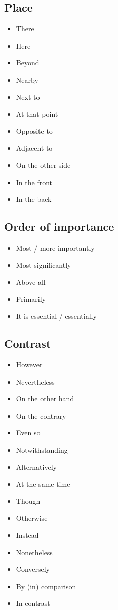 \subsection{Place}
\begin{itemize}
    \item There
    \item Here
    \item Beyond
    \item Nearby
    \item Next to
    \item At that point
    \item Opposite to
    \item Adjacent to
    \item On the other side
    \item In the front
    \item In the back
\end{itemize}

\subsection{Order of importance}
\begin{itemize}
    \item Most / more importantly
    \item Most significantly
    \item Above all
    \item Primarily
    \item It is essential / essentially
\end{itemize}


\subsection{Contrast}
\begin{itemize}
    \item However
    \item Nevertheless
    \item On the other hand
    \item On the contrary
    \item Even so
    \item Notwithstanding
    \item Alternatively
    \item At the same time
    \item Though
    \item Otherwise
    \item Instead
    \item Nonetheless
    \item Conversely
    \item By (in) comparison
    \item In contrast
\end{itemize}


